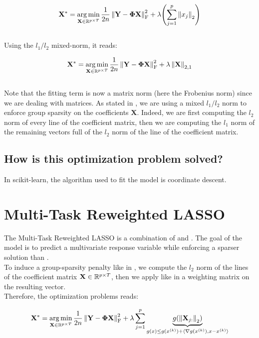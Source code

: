\documentclass[a4paper,10pt]{article}
\theoremstyle{definition}
\begin{document}
\begin{equation*}
    \mathbf{X}^* = \operatorname*{arg\,min}_{\mathbf{X} \in \mathbb{R}^{p \times T}} \frac{1}{2n} \left \lVert  \mathbf{Y} - \mathbf{\Phi X} \right \rVert_{\text{F}}^2 + \lambda \Biggl( \sum_{j=1}^p \left \lVert  x_{j} \right \rVert_2 \Biggr)
\end{equation*}
\\
Using the $l_1/l_2$ mixed-norm, it reads:

\begin{equation*}
    \mathbf{X}^* = \operatorname*{arg\,min}_{\mathbf{X} \in \mathbb{R}^{p \times T}} \frac{1}{2n} \left \lVert  \mathbf{Y} - \mathbf{\Phi X} \right \rVert_{\text{F}}^2 + \lambda \left \lVert  \mathbf{X} \right \rVert_{2, 1}
\end{equation*}
\\
Note that the fitting term is now a matrix norm (here the Frobenius norm) since we are dealing with matrices. As stated in , we are using a mixed $l_1/l_2$ norm to enforce group sparsity on the coefficients $\mathbf{X}$. Indeed,
we are first computing the $l_2$ norm of every line of the coefficient matrix, then we are computing the $l_1$ norm of the remaining vectors full of the $l_2$ norm of the line of the coefficient matrix.

\subsection*{How is this optimization problem solved?}

In scikit-learn, the algorithm used to fit the model is coordinate descent.

\section{Multi-Task Reweighted LASSO}
\label{section_5}

The Multi-Task Reweighted LASSO is a combination of  and . The goal of the model is to predict a multivariate response variable while enforcing a sparser solution than .
\\
To induce a group-sparsity penalty like in , we compute the $l_2$ norm of the lines of the coefficient matrix $\mathbf{X} \in \mathbb{R}^{p \times T}$, then we apply like in  a weighting matrix
on the resulting vector.
\\
Therefore, the optimization problems reads:

\begin{equation*}
    \mathbf{X}^* = \operatorname*{arg\,min}_{\mathbf{X} \in \mathbb{R}^{p \times T}} \frac{1}{2n} \left \lVert  \mathbf{Y} - \mathbf{\Phi X} \right \rVert_{\text{F}}^2 + \lambda \sum_{j=1}^p \underbrace{g(\left \lVert \mathbf{X}_{j:} \right \rVert_{2})}_{g(x) \leq g(x^{(k)}) + \langle \nabla g (x^{(k)}) , x - x^{(k)} \rangle }
\end{equation*}
\end{document}

